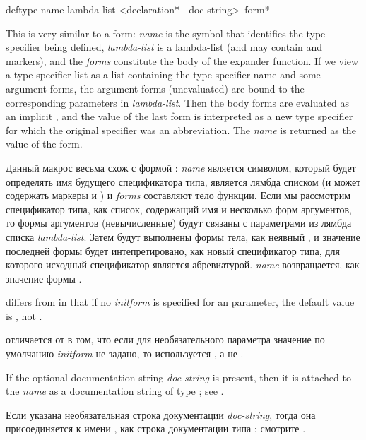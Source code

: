 \begin{defmac}
deftype name lambda-list <{declaration}* | doc-string> {\,form}*

This is very similar to a  form: \textit{name} is the
symbol that identifies the type specifier being defined, \textit{lambda-list} is
a lambda-list (and may contain  and 
markers), and
the \textit{forms} constitute the body of the expander function.  If we view a
type specifier list as a list containing the type specifier name and some argument forms,
the argument forms (unevaluated) are bound to the corresponding
parameters in \textit{lambda-list}.  Then the body forms are evaluated
as an implicit , and the value of the last form
is interpreted as a new type specifier for which the original specifier
was an abbreviation.  The \textit{name} is returned as the value of the
 form.

Данный макрос весьма схож с формой : \textit{name} является
символом, который будет определять имя будущего спецификатора типа,
 является лямбда списком (и может содержать маркеры  и
) и \textit{forms} составляют тело функции. Если мы рассмотрим
спецификатор типа, как список, содержащий имя и несколько форм аргументов, то
формы аргументов (невычисленные) будут связаны с параметрами из лямбда списка
\textit{lambda-list}. Затем будут выполнены формы тела, как неявный ,
и значение последней формы будет интепретировано, как новый спецификатор типа,
для которого исходный спецификатор является абревиатурой. \textit{name}
возвращается, как значение формы .

 differs from  in that if no \textit{initform}
is specified for an  parameter, the default value
is \cd{*}, not {\nil}.

 отличается от  в том, что если для необязательного 
параметра значение по умолчанию \textit{initform} не задано, то используется
\cd{*}, а не {\nil}.

If the optional documentation string \textit{doc-string} is present,
then it is attached to the \textit{name}
as a documentation string of type ; see .

Если указана необязательная строка документации \textit{doc-string}, тогда она
присоединяется к имени , как строка документации типа ;
смотрите .


\end{defmac}

